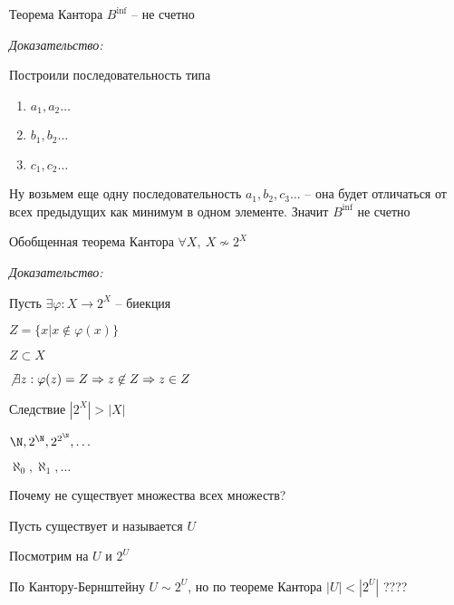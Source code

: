 \documentclass[12pt]{article}
\begin{document}
\begin{theo}{Теорема Кантора}
    $B^{\inf}$ -- не счетно
\end{theo}

\textit{Доказательство:}

Построили последовательность типа 

\begin{enumerate}
    \item $a_1, a_2 \ldots$
    \item $b_1, b_2 \ldots$
    \item $c_1, c_2 \ldots$
\end{enumerate}

Ну возьмем еще одну последовательность $a_1, b_2, c_3 \ldots$ -- она будет отличаться от всех предыдущих как минимум в одном элементе. Значит $B^{\inf}$ не счетно

\begin{theo}{Обобщенная теорема Кантора}
    $\forall X,\ X \not\sim 2^X$
\end{theo}

\textit{Доказательство:}

Пусть $\exists \varphi : X \rightarrow 2^X$ -- биекция

$Z = \{ x | x \not\in \varphi(x) \}$

$Z \subset X$

$\not\exists z : \varphi(z) = Z \Rightarrow z \not\in Z \Rightarrow z \in Z$

\begin{theo}{Следствие}
    $|2^X| > |X|$

    $\N, 2^{\N}, 2^{2^{\N}}, \ldots$

    $\aleph_0, \aleph_1, \ldots$
\end{theo}

\begin{Remark}{}
    Почему не существует множества всех множеств?

    Пусть существует и называется $U$

    Посмотрим на $U$ и $2^U$

    По Кантору-Бернштейну $U \sim 2^U$, но по теореме Кантора $|U| < |2^U|$ ???? 
\end{Remark}
\end{document}
